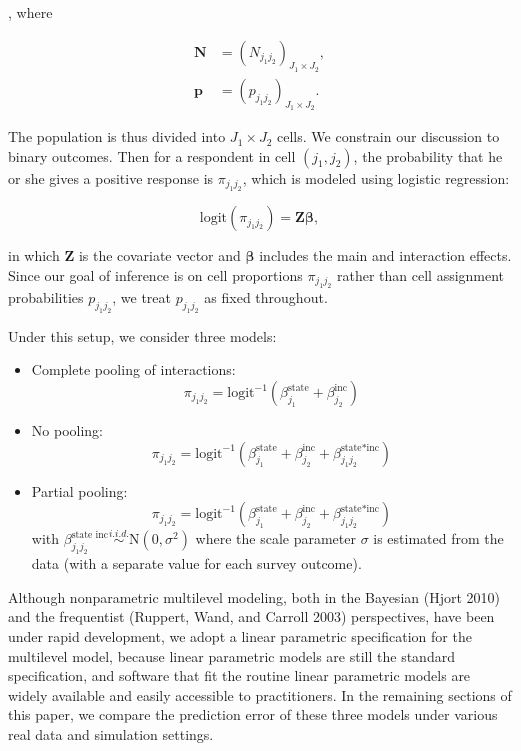 , where

\begin{align*}
  \bm{N}&=(N_{j_1j_2})_{J_1\times J_2},\\
  \bm{p}&=(p_{j_1j_2})_{J_1\times J_2}.
\end{align*}

\noindent The population is thus divided into \(J_1\times J_2\) cells.
We constrain our discussion to binary outcomes. Then for a respondent in
cell \((j_1, j_2)\), the probability that he or she gives a positive
response is \(\pi_{j_1j_2}\), which is modeled using logistic
regression:

\begin{equation*}
\text{logit}(\pi_{j_1j_2})=\bm Z\bm\beta,
\end{equation*}

\noindent in which \(\bm Z\) is the covariate vector and \(\bm\beta\)
includes the main and interaction effects. Since our goal of inference
is on cell proportions \(\pi_{j_1j_2}\) rather than cell assignment
probabilities \(p_{j_1j_2}\), we treat \(p_{j_1j_2}\) as fixed
throughout.

Under this setup, we consider three models:

\begin{itemize}
\item Complete pooling of interactions:
\begin{equation*}    \pi_{j_1j_2}=\text{logit}^{-1}\left(\beta^{\text{state}}_{j_1}+\beta^{\text{inc}}_{j_2}\right)\end{equation*}
\item
  No pooling:
\begin{equation*}    \pi_{j_1j_2}=\text{logit}^{-1}\left(\beta^{\text{state}}_{j_1}+\beta^{\text{inc}}_{j_2}+\beta^{\text{state*inc}}_{j_1j_2}\right)\end{equation*}

\item
  Partial pooling:
  \begin{equation*}  \pi_{j_1j_2}=\text{logit}^{-1}\left(\beta^{\text{state}}_{j_1}+\beta^{\text{inc}}_{j_2}+\beta^{\text{state*inc}}_{j_1j_2}\right) \end{equation*} with
    $\beta^{\text{state inc}}_{j_1j_2}\stackrel{i.i.d.}{\sim} \mbox{N}(0,\sigma^2)$
   \noindent where the scale parameter $\sigma$ is estimated from the data (with a separate value for each survey outcome).
\end{itemize}

Although nonparametric multilevel modeling, both in the Bayesian (Hjort
2010) and the frequentist (Ruppert, Wand, and Carroll 2003)
perspectives, have been under rapid development, we adopt a linear
parametric specification for the multilevel model, because linear
parametric models are still the standard specification, and software
that fit the routine linear parametric models are widely available and
easily accessible to practitioners. In the remaining sections of this
paper, we compare the prediction error of these three models under
various real data and simulation settings.

